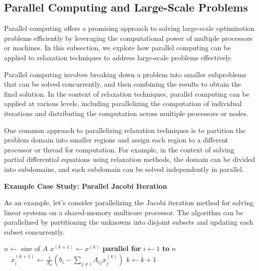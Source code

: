 \documentclass[12pt]{book} %
\begin{document}
\subsection{Parallel Computing and Large-Scale Problems}

Parallel computing offers a promising approach to solving large-scale optimization problems efficiently by leveraging the computational power of multiple processors or machines. In this subsection, we explore how parallel computing can be applied to relaxation techniques to address large-scale problems effectively.

Parallel computing involves breaking down a problem into smaller subproblems that can be solved concurrently, and then combining the results to obtain the final solution. In the context of relaxation techniques, parallel computing can be applied at various levels, including parallelizing the computation of individual iterations and distributing the computation across multiple processors or nodes.

One common approach to parallelizing relaxation techniques is to partition the problem domain into smaller regions and assign each region to a different processor or thread for computation. For example, in the context of solving partial differential equations using relaxation methods, the domain can be divided into subdomains, and each subdomain can be solved independently in parallel.

\textbf{Example Case Study: Parallel Jacobi Iteration}

As an example, let's consider parallelizing the Jacobi iteration method for solving linear systems on a shared-memory multicore processor. The algorithm can be parallelized by partitioning the unknowns into disjoint subsets and updating each subset concurrently.
\FloatBarrier
\begin{algorithm}[H]
\caption{Parallel Jacobi Iteration}
\begin{algorithmic}[1]
    \State $n \gets$ size of $A$
        \State $x^{(k+1)} \gets x^{(k)}$
        \State \textbf{parallel for} $i \gets 1$ \textbf{to} $n$
            \State $\quad x_i^{(k+1)} \gets \frac{1}{A_{ii}} \left( b_i - \sum_{j \neq i} A_{ij} x_j^{(k)} \right)$
        \State $k \gets k + 1$
    \EndWhile
\EndProcedure
\end{algorithmic}
\end{algorithm}
\FloatBarrier
\end{document}
